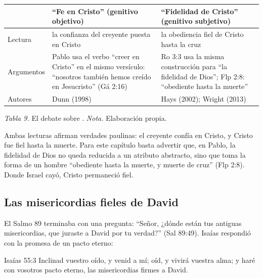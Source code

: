\begin{center}\small\renewcommand{\arraystretch}{1.25}
\begin{tabular}{@{}L{3.6cm}L{5.4cm}L{5.4cm}@{}}
\toprule
 & \textbf{``Fe en Cristo''} (genitivo objetivo) & \textbf{``Fidelidad de Cristo''} (genitivo subjetivo) \\ \midrule
Lectura & la confianza del creyente puesta en Cristo & la obediencia fiel de Cristo hasta la cruz \\
Argumentos & Pablo usa el verbo ``creer en Cristo'' en el mismo versículo: ``nosotros también hemos creído en Jesucristo'' (Gá 2:16) & Ro 3:3 usa la misma construcción para ``la fidelidad de Dios''; Flp 2:8: ``obediente hasta la muerte'' \\
Autores & Dunn (1998) & Hays (2002); Wright (2013) \\
\bottomrule
\end{tabular}\par
{\footnotesize\color{gris}\textit{Tabla 9.} El debate sobre . \textit{Nota.} Elaboración propia.}
\end{center}

Ambas lecturas afirman verdades paulinas: el creyente confía en Cristo, y Cristo fue fiel hasta la muerte. Para este capítulo basta advertir que, en Pablo, la fidelidad de Dios no queda reducida a un atributo abstracto, sino que toma la forma de un hombre ``obediente hasta la muerte, y muerte de cruz'' (Flp 2:8). Donde Israel cayó, Cristo permaneció fiel.


\subsection{Las misericordias fieles de David}\label{sec:davidfiel}
El Salmo 89 terminaba con una pregunta: ``Señor, ¿dónde están tus antiguas misericordias, que juraste a David por tu verdad?'' (Sal 89:49). Isaías respondió con la promesa de un pacto eterno:

\begin{verso}{Isaías 55:3}
Inclinad vuestro oído, y venid a mí; oíd, y vivirá vuestra alma; y haré con vosotros pacto eterno, las misericordias firmes a David.
\end{verso}

